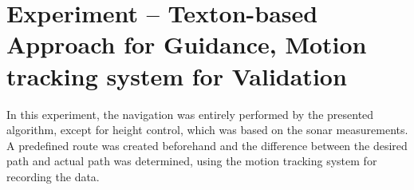 \section{Experiment -- Texton-based Approach for Guidance, Motion tracking system for Validation}
\label{sec:experiment-6}

In this experiment, the navigation was entirely performed by
the presented algorithm, except for height control, which was based on
the sonar measurements. A predefined route was created beforehand and
the difference between the desired path and actual path was
determined, using the motion tracking system for recording the data.
